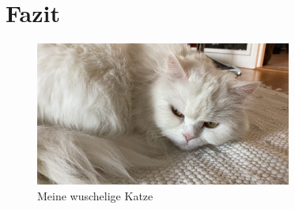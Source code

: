 \documentclass[12pt,parskip=half]{scrartcl}
\begin{document}
\blindtext[5] 



\section{Fazit}\label{sec:fazit}

\begin{figure}
\centering
\includegraphics[width=0.75\textwidth]{Bilder/miau}
\caption{Meine wuschelige Katze}\label{fig:miau}
\end{figure}


\blindtext[5]
\end{document}
